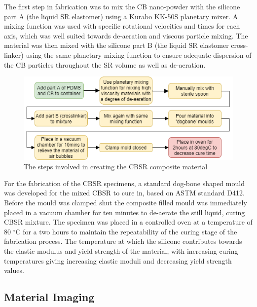 The first step in fabrication was to mix the CB nano-powder with the silicone part A (the liquid SR elastomer) using a Kurabo KK-50S planetary mixer. A mixing function was used with specific rotational velocities and times for each axis, which was well suited towards de-aeration and viscous particle mixing. The material was then mixed with the silicone part B (the liquid SR elastomer cross-linker) using the same planetary mixing function to ensure adequate dispersion of the CB particles throughout the SR volume as well as de-aeration.
\begin{figure}[H]
	\centering
	\includegraphics[width=0.8\linewidth]{Figures/specimenPrepFlowDiagram (1).png}
	\caption{The steps involved in creating the CBSR composite material}
	\label{fig:CBSR_flow_diagram}
\end{figure}
For the fabrication of the CBSR specimens, a standard dog-bone shaped mould was developed for the mixed CBSR to cure in, based on ASTM standard D412\cite{ASTM2020}. Before the mould was clamped shut the composite filled mould was immediately placed in a vacuum chamber for ten minutes to de-aerate the still liquid, curing CBSR mixture. The specimen was placed in a controlled oven at a temperature of 80 $^{\circ}$C for a two hours to maintain the repeatability of the curing stage of the fabrication process. The temperature at which the silicone contributes towards the elastic modulus and yield strength of the material, with increasing curing temperatures giving increasing elastic moduli and decreasing yield strength values.


\subsection{Material Imaging}

